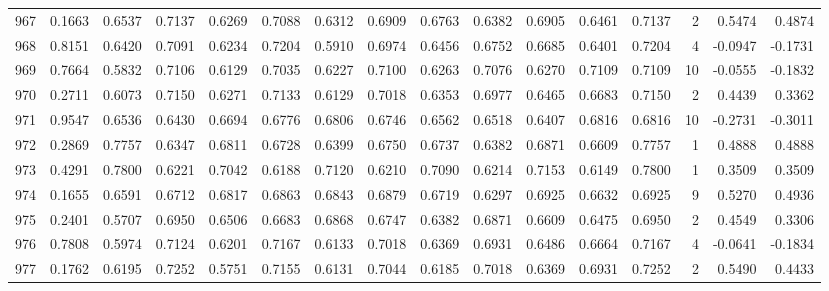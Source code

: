\begin{tabular}{lrrrrrrrrrrrrrrr}
967 &      0.1663 &  0.6537 &  0.7137 &  0.6269 &  0.7088 &  0.6312 &  0.6909 &  0.6763 &  0.6382 &  0.6905 &   0.6461 &     0.7137 &      2 &                    0.5474 &                     0.4874 \\
968 &      0.8151 &  0.6420 &  0.7091 &  0.6234 &  0.7204 &  0.5910 &  0.6974 &  0.6456 &  0.6752 &  0.6685 &   0.6401 &     0.7204 &      4 &                   -0.0947 &                    -0.1731 \\
969 &      0.7664 &  0.5832 &  0.7106 &  0.6129 &  0.7035 &  0.6227 &  0.7100 &  0.6263 &  0.7076 &  0.6270 &   0.7109 &     0.7109 &     10 &                   -0.0555 &                    -0.1832 \\
970 &      0.2711 &  0.6073 &  0.7150 &  0.6271 &  0.7133 &  0.6129 &  0.7018 &  0.6353 &  0.6977 &  0.6465 &   0.6683 &     0.7150 &      2 &                    0.4439 &                     0.3362 \\
971 &      0.9547 &  0.6536 &  0.6430 &  0.6694 &  0.6776 &  0.6806 &  0.6746 &  0.6562 &  0.6518 &  0.6407 &   0.6816 &     0.6816 &     10 &                   -0.2731 &                    -0.3011 \\
972 &      0.2869 &  0.7757 &  0.6347 &  0.6811 &  0.6728 &  0.6399 &  0.6750 &  0.6737 &  0.6382 &  0.6871 &   0.6609 &     0.7757 &      1 &                    0.4888 &                     0.4888 \\
973 &      0.4291 &  0.7800 &  0.6221 &  0.7042 &  0.6188 &  0.7120 &  0.6210 &  0.7090 &  0.6214 &  0.7153 &   0.6149 &     0.7800 &      1 &                    0.3509 &                     0.3509 \\
974 &      0.1655 &  0.6591 &  0.6712 &  0.6817 &  0.6863 &  0.6843 &  0.6879 &  0.6719 &  0.6297 &  0.6925 &   0.6632 &     0.6925 &      9 &                    0.5270 &                     0.4936 \\
975 &      0.2401 &  0.5707 &  0.6950 &  0.6506 &  0.6683 &  0.6868 &  0.6747 &  0.6382 &  0.6871 &  0.6609 &   0.6475 &     0.6950 &      2 &                    0.4549 &                     0.3306 \\
976 &      0.7808 &  0.5974 &  0.7124 &  0.6201 &  0.7167 &  0.6133 &  0.7018 &  0.6369 &  0.6931 &  0.6486 &   0.6664 &     0.7167 &      4 &                   -0.0641 &                    -0.1834 \\
977 &      0.1762 &  0.6195 &  0.7252 &  0.5751 &  0.7155 &  0.6131 &  0.7044 &  0.6185 &  0.7018 &  0.6369 &   0.6931 &     0.7252 &      2 &                    0.5490 &                     0.4433 \\

\end{tabular}
